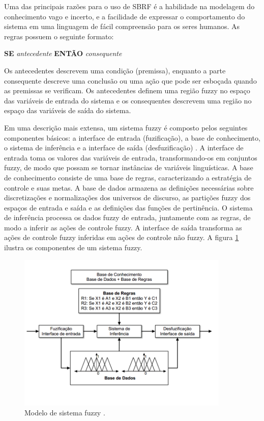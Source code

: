 \documentclass[template.tex]{subfiles}
\begin{document}
Uma das principais razões para o uso de SBRF é a habilidade na modelagem do conhecimento vago e incerto, e a facilidade de expressar o comportamento do sistema em uma linguagem de fácil compreensão para os seres humanos. As regras possuem o seguinte formato:

\begin{center}
\textbf{SE} \textit{antecedente} \textbf{ENTÃO} \textit{consequente}
\end{center}

Os antecedentes descrevem uma condição (premissa), enquanto a parte consequente descreve uma conclusão ou uma ação que pode ser esboçada quando as premissas se verificam. Os antecedentes definem uma região fuzzy no espaço das variáveis de entrada do sistema e os consequentes descrevem uma região no espaço das variáveis de saída do sistema. 

Em uma descrição mais extensa, um sistema fuzzy é composto pelos seguintes componentes básicos: a interface de entrada (fuzificação), a base de conhecimento, o sistema de inferência e a interface de saída (desfuzificação) \cite{gomide1995conceitos}. A interface de entrada toma os valores das variáveis de entrada, transformando-os em conjuntos fuzzy, de modo que possam se tornar instâncias de variáveis linguísticas. A base de conhecimento consiste de uma base de regras, caracterizando a estratégia de controle e suas metas. A base de dados armazena as definições necessárias sobre discretizações e normalizações dos universos de discurso, as partições fuzzy dos espaços de entrada e saída e as definições das funções de pertinência. O sistema de inferência processa os dados fuzzy de entrada, juntamente com as regras, de modo a inferir as ações de controle fuzzy. A interface de saída transforma as ações de controle fuzzy inferidas em ações de controle não fuzzy. A figura \ref{fig:sistema_nebuloso} ilustra os componentes de um sistema fuzzy.

\begin{figure}[tbh]  
  \caption{Modelo de sistema fuzzy \cite{herrera2008genetic}.}
  \label{fig:sistema_nebuloso}
  \centering
    \includegraphics[width=0.9\textwidth]{sistema_nebuloso}
\end{figure}
\end{document}
